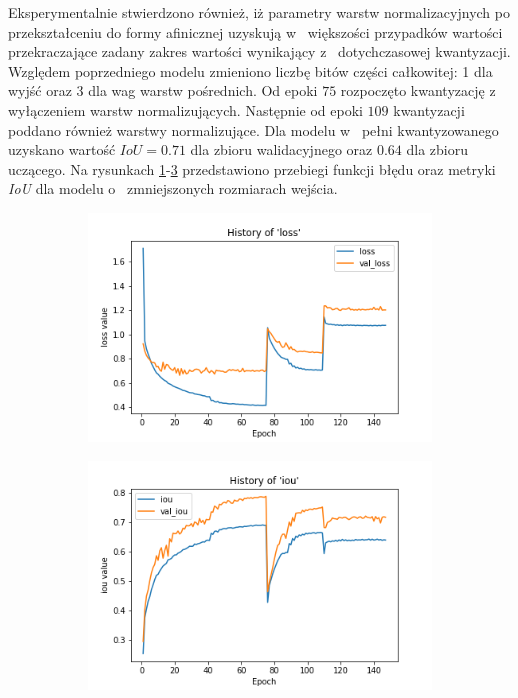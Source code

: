 Eksperymentalnie stwierdzono również, iż parametry warstw normalizacyjnych po przekształceniu do formy afinicznej uzyskują w~ większości przypadków wartości przekraczające zadany zakres wartości wynikający z~ dotychczasowej kwantyzacji.
Względem poprzedniego modelu zmieniono liczbę bitów części całkowitej: 1 dla wyjść oraz 3 dla wag warstw pośrednich.
Od epoki $75$ rozpoczęto kwantyzację z~ wyłączeniem warstw normalizujących.
Następnie od epoki $109$ kwantyzacji poddano również warstwy normalizujące.
Dla modelu w~ pełni kwantyzowanego uzyskano wartość $IoU = 0.71$ dla zbioru walidacyjnego oraz $0.64$ dla zbioru uczącego. 
Na rysunkach \ref{fig:small_loss}-\ref{fig:small_iou} przedstawiono przebiegi funkcji błędu oraz metryki \emph{IoU} dla modelu o~ zmniejszonych rozmiarach wejścia. 

\begin{figure}
     \centering
     \begin{subfigure}[b]{0.49\textwidth}
         \centering
         \includegraphics[width=\textwidth]{images/LN_smaller_hist_of_loss.png}
         \caption{}
         \label{fig:small_loss}
     \end{subfigure}
     \hfill
     \begin{subfigure}[b]{0.49\textwidth}
         \centering
         \includegraphics[width=\textwidth]{images/LN_smaller_hist_of_iou.png}
         \caption{}
         \label{fig:small_iou}
     \end{subfigure}
     

\end{figure}
